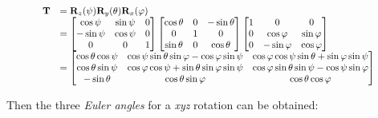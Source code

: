 \documentclass[10pt,b5paper,titlepage]{book}
\begin{document}
\begin{enumerate}
        \begin{equation}
            \scalebox{0.85}{
                $ \begin{array}{ll}
                    \mathbf{T}
                    &= \mathbf{R}_{z}(\psi)\mathbf{R}_{y}(\theta)\mathbf{R}_{x}(\varphi) \\
                    &=
                    \begin{bmatrix}
                        \cos \psi & \sin \psi & 0 \\
                        -\sin \psi & \cos \psi & 0 \\
                        0 & 0 & 1
                    \end{bmatrix}
                    \begin{bmatrix}
                        \cos \theta & 0 & -\sin \theta \\
                        0 & 1 & 0 \\
                        \sin \theta & 0 & \cos \theta
                    \end{bmatrix}
                    \begin{bmatrix}
                        1 & 0 & 0 \\
                        0 & \cos \varphi & \sin \varphi \\
                        0 & -\sin \varphi & \cos \varphi
                    \end{bmatrix} \\
                    &=
                    \begin{bmatrix}
                        \cos \theta \cos \psi
                        & \cos \psi \sin \theta \sin \varphi - \cos \varphi \sin \psi
                        & \cos \varphi \cos \psi \sin \theta + \sin \varphi \sin \psi \\
                        \cos \theta \sin \psi
                        & \cos \varphi \cos \psi + \sin \theta \sin \varphi \sin \psi
                        & \cos \varphi \sin \theta \sin \psi - \cos \psi \sin \varphi \\
                        -\sin \theta
                        & \cos \theta \sin \varphi
                        & \cos \theta \cos \varphi
                    \end{bmatrix}
                \end{array} $
            }
        \end{equation}

        Then the three \textit{Euler angles} for a \textit{xyz} rotation
        can be obtained:


\end{enumerate}
\end{document}
